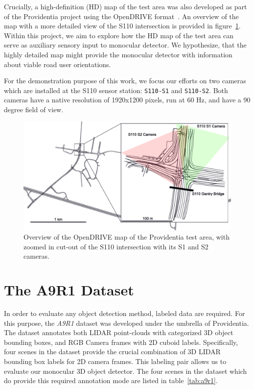 Crucially, a high-definition (HD) map of the test area was also developed as part of the Providentia project using the OpenDRIVE format~\cite{dupuis2010opendrive}.
An overview of the map with a more detailed view of the S110 intersection is provided in figure~\ref{fig:providentia-opendrive-map}.
Within this project, we aim to explore how the HD map of the test area can serve as  auxiliary sensory input to monocular detector.
We hypothesize, that the highly detailed map might provide the monocular detector with information about viable road user orientations.

For the demonstration purpose of this work, we focus our efforts on two cameras which are installed at the S110 sensor station: \texttt{S110-S1} and \texttt{S110-S2}.
Both cameras have a native resolution of 1920x1200 pixels, run at 60 Hz, and have a 90 degree field of view.  %

\begin{figure}[htb]
    \includegraphics[width=\linewidth]{figures/map}
    \caption{Overview of the OpenDRIVE map of the Providentia test area, with zoomed in cut-out of the S110 intersection with its S1 and S2 cameras.}
    \label{fig:providentia-opendrive-map}
\end{figure}


\section{The A9R1 Dataset}
\label{sec:a9dataset}

In order to evaluate any object detection method, labeled data are required.
For this purpose, the \textit{A9R1} dataset was developed under the umbrella of Providentia.
The dataset annotates both LIDAR point-clouds with categorized 3D object bounding boxes, and RGB Camera frames with 2D cuboid labels.
Specifically, four scenes in the dataset provide the crucial combination of 3D LIDAR bounding box labels for 2D camera frames.
This labeling pair allows us to evaluate our monocular 3D object detector.
The four scenes in the dataset which do provide this required annotation mode are listed in table~\ref{tab:a9r1}.

